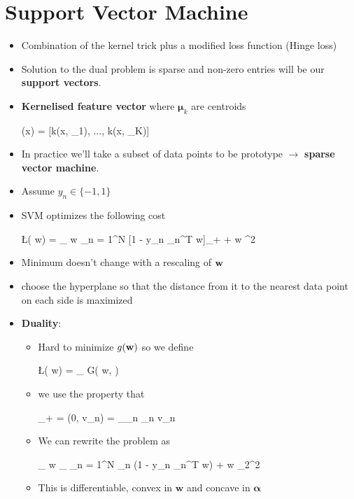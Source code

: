 \section{Support Vector Machine} 
\begin{itemize}
	\item Combination of the kernel trick plus a modified loss function (Hinge loss)
	\item Solution to the dual problem is sparse and non-zero entries will be our \textbf{support vectors}.
	\item \textbf{Kernelised feature vector} where $\bm \mu_k$ are centroids
	\begin{myalign*}
	    \bm \phi(\*x) = [k(\*x, \bm \mu_1), ..., k(\*x, \bm \mu_K)]
	\end{myalign*}
	\item In practice we'll take a subset of data points to be prototype $\rightarrow$ \textbf{sparse vector machine}.
	\item Assume $y_n \in \{-1, 1\}$
	\item SVM optimizes the following cost
	\begin{myalign*}
	    \L(\* w) = \min_{\* w} \sum_{n = 1}^N [1 - \*y_n \tilde{\* \phi}_n^T \* w]_+ +  \lVert \*w \lVert^2
	\end{myalign*}
	\item Minimum doesn't change with a rescaling of $\mathbf{w}$
	\item choose the hyperplane so that the distance from it to the nearest data point on each side is maximized
	\item \textbf{Duality}:
	\begin{itemize}
		\item Hard to minimize $g(\mathbf{w})$ so we define
		\begin{myalign*}
		    \L(\* w) = \max_{\bm \alpha} G(\* w, \bm \alpha)
		\end{myalign*}
		\item we use the property that
		\begin{myalign*}
		    [\*v_n]_+ = \max(0, \*v_n) = \max_{\alpha_n \in [0, 1]} \alpha_n \*v_n
		\end{myalign*}
		\item We can rewrite the problem as
		\begin{myalign*}
		    \min_{\* w} \max_{\alpha} \sum_{n = 1}^N \alpha_n (1 - \*y_n \bm \phi_n^T \* w) +  \lVert \*w \lVert_2^2 
		\end{myalign*}
		\item This is differentiable, convex in $\bm w$ and concave in $\bm \alpha$

\end{itemize}
\end{itemize}
